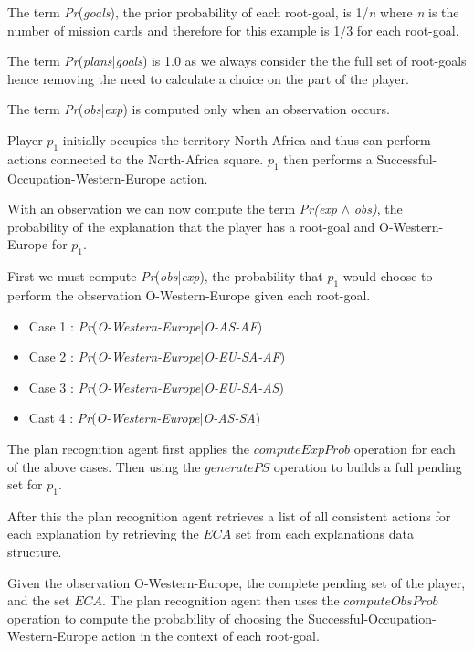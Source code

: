 \documentclass[parskip]{cs4rep}
\begin{document}
The term \textit{Pr}(\textit{goals}), the prior probability of each root-goal, is 1/\textit{n} where \textit{n} is the number of mission cards and therefore for this example is 1/3 for each root-goal. 

The term \textit{Pr}(\textit{plans}|\textit{goals}) is 1.0 as we always consider the the full set of root-goals hence removing the need to calculate a choice on the part of the player.

The term \textit{Pr}(\textit{obs}|\textit{exp}) is computed only when an observation occurs.

Player $p_1$ initially occupies the territory North-Africa and thus can perform actions connected to the North-Africa square. $p_1$ then performs a Successful-Occupation-Western-Europe action.

With an observation we can now compute the term \textit{Pr(exp} $\wedge$ \textit{obs)}, the probability of the explanation that the player has a root-goal and O-Western-Europe for $p_1$.

First we must compute \textit{Pr}(\textit{obs}|\textit{exp}), the probability that $p_1$ would choose to perform the observation O-Western-Europe given each root-goal.

\begin{itemize}
\item
Case 1 : \textit{Pr}(\textit{O-Western-Europe}|\textit{O-AS-AF})
\item
Case 2 : \textit{Pr}(\textit{O-Western-Europe}|\textit{O-EU-SA-AF})
\item
Case 3 : \textit{Pr}(\textit{O-Western-Europe}|\textit{O-EU-SA-AS})
\item
Cast 4 : \textit{Pr}(\textit{O-Western-Europe}|\textit{O-AS-SA})
\end{itemize}

The plan recognition agent first applies the $computeExpProb$ operation for each of the above cases. Then using the $generatePS$ operation to builds a full pending set for $p_1$.

After this the plan recognition agent retrieves a list of all consistent actions for each explanation by retrieving the $ECA$ set from each explanations data structure.

Given the observation O-Western-Europe, the complete pending set of the player, and the set $ECA$. The plan recognition agent then uses the $computeObsProb$ operation to compute the probability of choosing the Successful-Occupation-Western-Europe action in the context of each root-goal.
\end{document}
